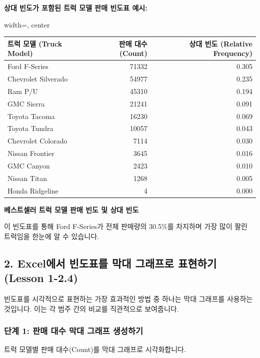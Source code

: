 \documentclass[11pt,a4paper]{book}
\providecommand{\captionof}[2]{\textbf{#2}}
\theoremstyle{definition}
\begin{document}
\begin{examplebox}
\textbf{상대 빈도가 포함된 트럭 모델 판매 빈도표 예시:}
\begin{adjustbox}{width=\textwidth, center}
\begin{tabular}{lrr}
\toprule
\textbf{트럭 모델 (Truck Model)} & \textbf{판매 대수 (Count)} & \textbf{상대 빈도 (Relative Frequency)} \\
\midrule
Ford F-Series & 71332 & 0.305 \\
Chevrolet Silverado & 54977 & 0.235 \\
Ram P/U & 45310 & 0.194 \\
GMC Sierra & 21241 & 0.091 \\
Toyota Tacoma & 16230 & 0.069 \\
Toyota Tundra & 10057 & 0.043 \\
Chevrolet Colorado & 7114 & 0.030 \\
Nissan Frontier & 3645 & 0.016 \\
GMC Canyon & 2423 & 0.010 \\
Nissan Titan & 1268 & 0.005 \\
Honda Ridgeline & 4 & 0.000 \\
\bottomrule
\end{tabular}
\end{adjustbox}
\captionof{table}{베스트셀러 트럭 모델 판매 빈도 및 상대 빈도}
\end{examplebox}
이 빈도표를 통해 Ford F-Series가 전체 판매량의 30.5\%를 차지하며 가장 많이 팔린 트럭임을 한눈에 알 수 있습니다.


\subsection{2. Excel에서 빈도표를 막대 그래프로 표현하기 (Lesson 1-2.4)}

빈도표를 시각적으로 표현하는 가장 효과적인 방법 중 하나는 막대 그래프를 사용하는 것입니다. 이는 각 범주 간의 비교를 직관적으로 보여줍니다.

\subsubsection*{단계 1: 판매 대수 막대 그래프 생성하기}
트럭 모델별 판매 대수(Count)를 막대 그래프로 시각화합니다.
\end{document}
